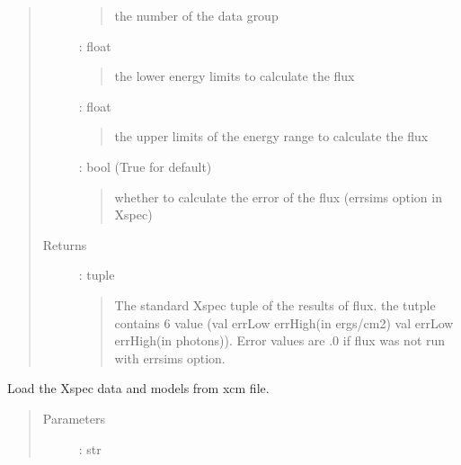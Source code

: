 \documentclass[letterpaper,10pt,english]{sphinxmanual}
\begin{document}
\begin{fulllineitems}
\begin{fulllineitems}
\begin{quote}
\begin{description}
\begin{quote}
\sphinxAtStartPar
the number of the data group
\end{quote}

\sphinxAtStartPar
{} : float
\begin{quote}

\sphinxAtStartPar
the lower energy limits to calculate the flux
\end{quote}

\sphinxAtStartPar
{} : float
\begin{quote}

\sphinxAtStartPar
the upper limits of the energy range to calculate the flux
\end{quote}

\sphinxAtStartPar
{} : bool (True for default)
\begin{quote}

\sphinxAtStartPar
whether to calculate the error of the flux (errsims option in Xspec)
\end{quote}

\item[{Returns}] \leavevmode
\sphinxAtStartPar
{} : tuple
\begin{quote}

\sphinxAtStartPar
The standard Xspec tuple of the results of flux.
the tutple contains 6 value (val errLow errHigh(in ergs/cm2) val errLow errHigh(in photons)).
Error values are .0 if flux was not run with errsims option.
\end{quote}

\end{description}\end{quote}

\end{fulllineitems}


\begin{fulllineitems}
\label{\detokenize{APIdocs/xspecanalysis:ixpetools.xspeclib.io.XspecSpec.fromxcm}}
\sphinxAtStartPar
Load the Xspec data and models from xcm file.
\begin{quote}\begin{description}
\item[{Parameters}] \leavevmode
\sphinxAtStartPar
{} : str
\begin{quote}


\end{quote}
\end{description}
\end{quote}
\end{fulllineitems}
\end{fulllineitems}
\end{document}
